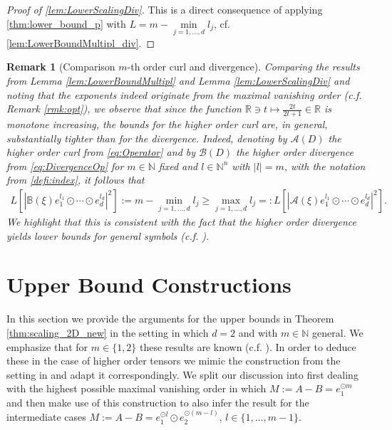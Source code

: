 \documentclass[a4paper, 10pt, twoside, notitlepage]{amsart}
\theoremstyle{plain}
\newtheorem{rmk}[prop]{Remark}
\newcommand{\R}{\mathbb{R}}
\newcommand{\N}{\mathbb{N}}
\newcommand{\A}{\mathcal{A}}
\begin{document}
		
                
			\begin{proof}[Proof of  \cref{lem:LowerScalingDiv}]
			This is a direct consequence of applying \cref{thm:lower_bound_p} with $L = m - \min\limits_{j=1,\dots,d}l_j$, cf. \cref{lem:LowerBoundMultipl_div}.
			\end{proof}
				
				
				
				\begin{rmk}[Comparison $m$-th order curl and divergence] \label{rmk:comp}
                                  Comparing the results from Lemma \ref{lem:LowerBoundMultipl} and Lemma \ref{lem:LowerScalingDiv} and noting that the exponents indeed originate from the maximal vanishing order (c.f. Remark \ref{rmk:opt}), we observe that since the function $\R \ni t \mapsto \frac{2t}{2t+1} \in \R$ is monotone increasing, the bounds for the higher order curl are, in general, substantially tighter than for the divergence.
                                  Indeed, denoting by $\A(D)$ the higher order curl from \eqref{eq:Operator} and by $\mathcal{B}(D)$ the higher order divergence from \eqref{eq:DivergenceOp} for $m\in \N$ fixed and $l\in \N^n$ with $|l|=m$, with the notation from \cref{defi:index}, it follows that
\begin{align*}
L\left[|\mathbb{B}(\xi) e_1^{l_1}\odot \cdots \odot e_{d}^{l_d}|^2 \right]:= m - \min\limits_{j=1,\dots,d} l_j \geq \max\limits_{j=1,\dots, d} l_j =: L\left[|\A(\xi) e_1^{l_1}\odot \cdots \odot e_{d}^{l_d}|^2\right].
\end{align*}
We highlight that this is consistent with the fact that the higher order divergence yields lower bounds for general symbols (c.f. \cite[Appendix B]{RRT22}).
\end{rmk}
		
		
		\section{Upper Bound Constructions}
		\label{sec:upper}
		
		In this section we provide the arguments for the upper bounds in Theorem \ref{thm:scaling_2D_new} in the setting in which $d=2$ and with $m\in \N$ general. We emphasize that for $m\in \{1,2\}$
                these results are known (c.f. \cite{CC15}). In order to deduce these in the case of higher order tensors we mimic the construction from the setting in \cite{CC15} and
		adapt it correspondingly. We split our discussion into first dealing with the highest possible maximal vanishing order in which $M:=A-B = e_1^{\odot m}$ and then make use of this construction to also infer the result
		for the intermediate cases $M:=A-B = e_1^{\odot l} \odot e_2^{\odot(m-l)}$, $l \in \{1,\dots,m-1\}$.
		
\end{document}
